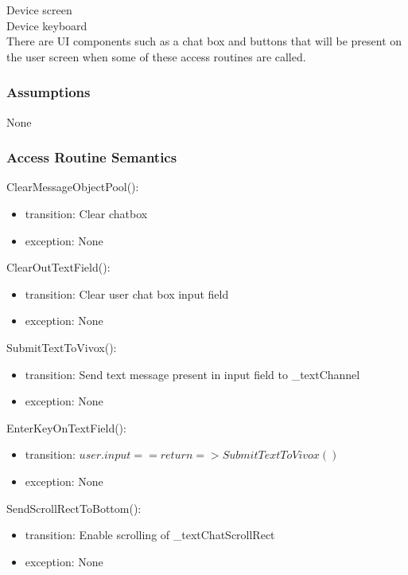 \documentclass[12pt, titlepage]{article}
\begin{document}
Device screen\\
Device keyboard\\
There are UI components such as a chat box and buttons that will be present on the user screen when some of these access routines are called.\\

\subsubsection{Assumptions}

None\\

\subsubsection{Access Routine Semantics}

\noindent ClearMessageObjectPool():
\begin{itemize}
\item transition: Clear chatbox
\item exception: None
\end{itemize}


\noindent ClearOutTextField():
\begin{itemize}
\item transition: Clear user chat box input field
\item exception: None
\end{itemize}

\noindent SubmitTextToVivox():
\begin{itemize}
\item transition: Send text message present in input field to \_textChannel
\item exception: None
\end{itemize}

\noindent EnterKeyOnTextField():
\begin{itemize}
\item transition: $user.input == return =>  SubmitTextToVivox()$
\item exception: None
\end{itemize}

\noindent SendScrollRectToBottom():
\begin{itemize}
\item transition: Enable scrolling of \_textChatScrollRect
\item exception: None
\end{itemize}
\end{document}
